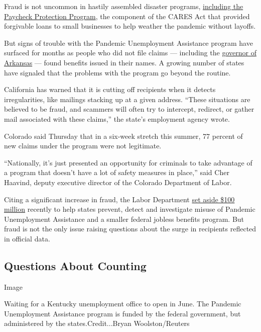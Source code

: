 Fraud is not uncommon in hastily assembled disaster programs,
\href{https://www.nytimes3xbfgragh.onion/2020/09/10/us/politics/ppp-fraud-coronavirus.html}{including
the Paycheck Protection Program}, the component of the CARES Act that
provided forgivable loans to small businesses to help weather the
pandemic without layoffs.

But signs of trouble with the Pandemic Unemployment Assistance program
have surfaced for months as people who did not file claims --- including
the \href{https://apnews.com/9b9a84686d61e1822486e9b04423640d}{governor
of Arkansas} --- found benefits issued in their names. A growing number
of states have signaled that the problems with the program go beyond the
routine.

California has warned that it is cutting off recipients when it detects
irregularities, like mailings stacking up at a given address. ``These
situations are believed to be fraud, and scammers will often try to
intercept, redirect, or gather mail associated with these claims,'' the
state's employment agency wrote.

Colorado said Thursday that in a six-week stretch this summer, 77
percent of new claims under the program were not legitimate.

``Nationally, it's just presented an opportunity for criminals to take
advantage of a program that doesn't have a lot of safety measures in
place,'' said Cher Haavind, deputy executive director of the Colorado
Department of Labor.

Citing a significant increase in fraud, the Labor Department
\href{https://wdr.doleta.gov/directives/attach/UIPL/UIPL_28-20.pdf}{set
aside \$100 million} recently to help states prevent, detect and
investigate misuse of Pandemic Unemployment Assistance and a smaller
federal jobless benefits program. But fraud is not the only issue
raising questions about the surge in recipients reflected in official
data.

\hypertarget{questions-about-counting}{%
\subsection{Questions About Counting}\label{questions-about-counting}}

Image

Waiting for a Kentucky unemployment office to open in June. The Pandemic
Unemployment Assistance program is funded by the federal government, but
administered by the states.Credit...Bryan Woolston/Reuters

